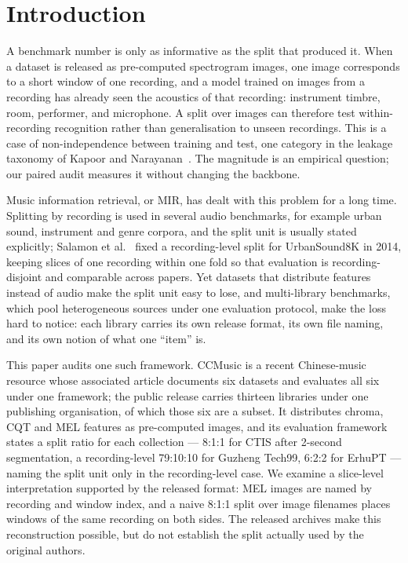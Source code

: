 \section{Introduction}\label{sec:intro}

A benchmark number is only as informative as the split that produced it. When a dataset is
released as pre-computed spectrogram images, one image corresponds to a short window of one
recording, and a model trained on images from a recording has already seen the acoustics of
that recording: instrument timbre, room, performer, and microphone. A split over images can
therefore test within-recording recognition rather than generalisation to unseen recordings.
This is a case of non-independence between training and test, one category in the leakage
taxonomy of Kapoor and Narayanan~\cite{kapoor2023leakage}. The magnitude is an empirical
question; our paired audit measures it without changing the backbone.

Music information retrieval, or MIR, has dealt with this problem for a long time. Splitting by recording is
used in several audio benchmarks, for example urban sound, instrument and genre corpora, and the
split unit is usually stated explicitly; Salamon et al.~\cite{salamon2014urbansound} fixed a recording-level split for
UrbanSound8K in 2014, keeping slices of one recording within one fold so that evaluation is
recording-disjoint and comparable across papers. Yet datasets
that distribute features instead of audio make the split unit easy to lose, and multi-library
benchmarks, which pool heterogeneous sources under one evaluation protocol, make the loss hard
to notice: each library carries its own release format, its own file naming, and its own notion
of what one ``item'' is.

This paper audits one such framework. CCMusic \citep{zhou2025ccmusic} is a recent Chinese-music
resource whose associated article documents six datasets and evaluates all six under one
framework; the public release carries thirteen libraries under one publishing organisation, of
which those six are a subset. It distributes chroma, CQT and MEL features as pre-computed
images, and its evaluation framework states a split ratio for each collection --- 8:1:1 for
CTIS after 2-second segmentation, a recording-level 79:10:10 for Guzheng Tech99, 6:2:2 for
ErhuPT --- naming the split unit only in the recording-level case. We examine a
slice-level interpretation supported by the released format: MEL images are named by recording
and window index, and a naive 8:1:1 split over image filenames places windows of the same
recording on both sides. The released archives make this reconstruction possible, but do not
establish the split actually used by the original authors.

